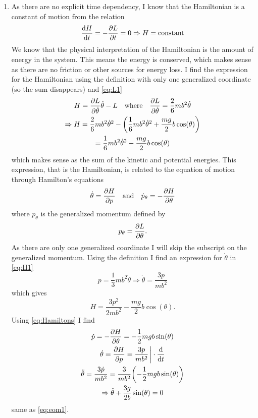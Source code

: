 \documentclass[11pt,a4paper]{report}
\newcounter{excount}[chapter]
\newenvironment{exercise}[1][]{\addtocounter{excount}{1} \noindent {\bf Problem
    \arabic{excount} \ \ #1}\hspace{2mm}}{\vspace{4mm}}
\newcommand{\half}
{
\frac{1}{2}
}
\newcommand{\qwhere}
{
\qq{where}
}
\newcommand{\Lpdv}[1]
{
\pdv{L}{#1}
}
\newcommand{\Hpdv}[1]
{
\pdv{H}{#1}
}
\newcommand{\dtheta}
{
\dot{\theta}
}
\newcommand{\ddtheta}
{
\ddot{\theta}
}
\newcommand{\cost}
{
\cos(\theta)
}
\newcommand{\sint}
{
\sin(\theta)
}
\begin{document}
\begin{multicols}{2}
\begin{exercise}
\begin{enumerate}[\bf a)]
\item As there are no explicit time dependency, I know that the Hamiltonian is a constant of motion from the relation
\[\dv{H}{t} = -\pdv{L}{t} = 0 \Rightarrow H = \text{constant}\]
We know that the physical interpretation of the Hamiltonian is the amount of energy in the system. This means the energy is conserved, which makes sense as there are no friction or other sources for energy loss. I find the expression for the Hamiltonian using the definition with only one generalized coordinate (so the sum disappears) and \cref{eq:L1}
\begin{gather}
H = \Lpdv{\dtheta}\dtheta -L \qwhere \Lpdv{\dtheta} = \frac{2}{6}mb^2\dtheta \notag
\\
\Rightarrow H = \frac{2}{6}mb^2\dtheta^2 -\qty(\frac{1}{6}mb^2\dtheta^2 +\frac{mg}{2}b\cost) \notag
\\
= \frac{1}{6}mb^2\dtheta^2 - \frac{mg}{2}b\cost \label{eq:H1}
\end{gather}
which makes sense as the sum of the kinetic and potential energies. This expression, that is the Hamiltonian, is related to the equation of motion through Hamilton's equations
\begin{gather}
\dtheta = \Hpdv{p} \qand \dot{p}_\theta = -\Hpdv{\theta} \label{eq:Hamiltons}
\end{gather}
where $p_\theta$ is the generalized momentum defined by \[p_\theta = \Lpdv{\theta}.\]
As there are only one generalized coordinate I will skip the subscript on the generalized momentum. Using the definition I find an expression for $\dtheta$ in \cref{eq:H1}
\[p = \frac{1}{3}mb^2\dtheta \Rightarrow \dtheta = \frac{3p}{mb^2} \]
which gives \[ H = \frac{3p^2}{2mb^2} -\frac{mg}{2}b\cost.\]
Using \cref{eq:Hamiltons} I find
\begin{gather*}
\dot{p} = - \Hpdv{\theta} = -\half mgb\sint
\\
\dtheta = \Hpdv{p} = \frac{3p}{mb^2} \eval \cdot \dv{t}
\\
\ddtheta = \frac{3\dot{p}}{mb^2} = \frac{3}{mb^2}\qty(-\half mgb\sint)
\\
\Rightarrow \ddtheta + \frac{3g}{2b}\sint = 0
\end{gather*}
same as \cref{eq:eom1}.


\end{enumerate}
\end{exercise}
\end{multicols}
\end{document}
